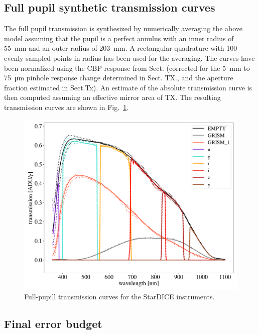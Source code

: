 \subsection{Full pupil synthetic transmission curves}

The full pupil transmission is synthesized by numerically averaging
the above model assuming that the pupil is a perfect annulus with an
inner radius of \SI{55}{mm} and an outer radius of \SI{203}{mm}. A
rectangular quadrature with 100 evenly sampled points in radius has
been used for the averaging. The curves have been normalized using the
CBP response from Sect. (corrected for the \SI{5}{mm} to
\SI{75}{\micro\meter} pinhole response change determined in Sect. TX.,
and the aperture fraction estimated in Sect.Tx).  An estimate of the
absolute transmission curve is then computed assuming an effective
mirror area of TX. The resulting transmission curves are shown in
Fig.~\ref{fig:fullpupiltrans}.
\begin{figure}
  \centering
  \includegraphics[width=1\linewidth]{fig/fullpupill.pdf}
  \caption{Full-pupill transmission curves for the StarDICE instruments.}
  \label{fig:fullpupiltrans}
\end{figure}



\subsection{Final error budget}
